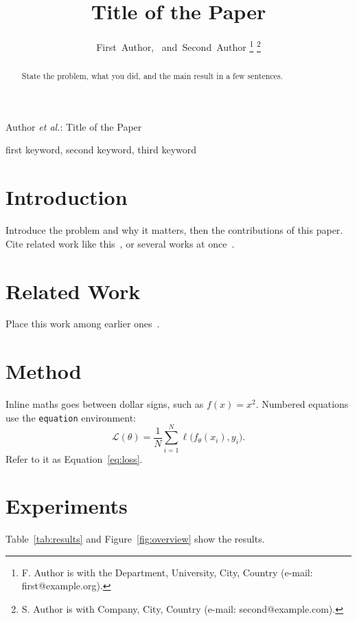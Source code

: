 \documentclass[journal]{IEEEtran}
\begin{document}
\title{Title of the Paper}

\author{First~Author,~
        and~Second~Author%
\thanks{F. Author is with the Department, University, City, Country (e-mail: first@example.org).}%
\thanks{S. Author is with Company, City, Country (e-mail: second@example.com).}}

%
{Author \MakeLowercase{\textit{et al.}}: Title of the Paper}

\maketitle

\begin{abstract}
State the problem, what you did, and the main result in a few sentences.
\end{abstract}

\begin{IEEEkeywords}
first keyword, second keyword, third keyword
\end{IEEEkeywords}

\section{Introduction}
\label{sec:intro}
Introduce the problem and why it matters, then the contributions of this
paper. Cite related work like this~\cite{he2016deep}, or several works at
once~\cite{vaswani2017attention,he2016deep}.

\section{Related Work}
Place this work among earlier ones~\cite{knuth1984,lamport1994}.

\section{Method}
\label{sec:method}
Inline maths goes between dollar signs, such as $f(x) = x^2$. Numbered
equations use the \texttt{equation} environment:
\begin{equation}
  \label{eq:loss}
  \mathcal{L}(\theta) = \frac{1}{N} \sum_{i=1}^{N} \ell\bigl(f_\theta(x_i), y_i\bigr).
\end{equation}
Refer to it as Equation~\eqref{eq:loss}.

\section{Experiments}
\label{sec:experiments}
Table~\ref{tab:results} and Figure~\ref{fig:overview} show the results.
\end{document}

